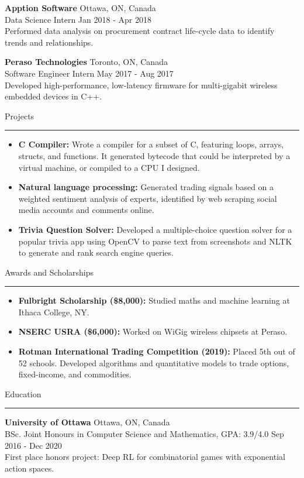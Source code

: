 \documentclass[12pt]{article}
\newcommand{\rSection}[1]{
    \medskip
    {\Large #1}
    \medskip
    \hrule
}
\newcommand{\rItem}[2]{
    \item {\bf #1:} #2
    \vspace{-5pt}
}
\begin{document}
{\bf Apption Software} \hfill Ottawa, ON, Canada\\
Data Science Intern \hfill Jan 2018 - Apr 2018\\
Performed data analysis on procurement contract life-cycle data to identify trends and relationships. 


{\bf Peraso Technologies} \hfill Toronto, ON, Canada\\
Software Engineer Intern \hfill May 2017 - Aug 2017\\
Developed high-performance, low-latency firmware for multi-gigabit wireless embedded devices in C++.


\rSection{Projects}
\begin{itemize}[label={},leftmargin=0pt]
    \setlength\itemsep{0em}
    \rItem{C Compiler}{Wrote a compiler for a subset of C, featuring loops, arrays, structs, and functions. It generated bytecode that could be interpreted by a virtual machine, or compiled to a CPU I designed.}
    \rItem{Natural language processing}{Generated trading signals based on a weighted sentiment analysis of experts, identified by web scraping social media accounts and comments online.}
    \rItem{Trivia Question Solver}{Developed a multiple-choice question solver for a popular trivia app using OpenCV to parse text from screenshots and NLTK to generate and rank search engine queries.}
\end{itemize}


\rSection{Awards and Scholarships}
\begin{itemize}[label={},leftmargin=0pt]
    \rItem{Fulbright Scholarship (\$8,000)}{Studied maths and machine learning at Ithaca College, NY.}
    \rItem{NSERC USRA (\$6,000)} {Worked on WiGig wireless chipsets at Peraso.}
    \rItem{Rotman International Trading Competition (2019)} {Placed 5th out of 52 schools. Developed algorithms and quantitative models to trade options, fixed-income, and commodities.}
\end{itemize}



\rSection{Education}
{\bf University of Ottawa} \hfill Ottawa, ON, Canada\\
BSc. Joint Honours in Computer Science and Mathematics, GPA: 3.9/4.0 \hfill Sep 2016 - Dec 2020\\
First place honors project: Deep RL for combinatorial games with exponential action spaces.
\vspace{-5pt}
\end{document}
